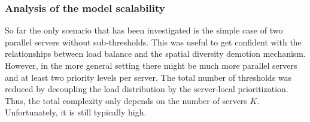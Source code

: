 \subsubsection{Analysis of the model scalability}
So far the only scenario that has been investigated is the simple case of two parallel servers without sub-thresholds. This was useful to get confident with the relationships between load balance and the spatial diversity demotion mechanism. However, in the more general setting there might be much more parallel servers and at least two priority levels per server. The total number of thresholds was reduced by decoupling the load distribution by the server-local prioritization. Thus, the total complexity only depends on the number of servers $K$. Unfortunately, it is still typically high. 
